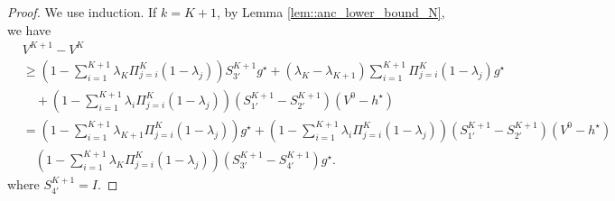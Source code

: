 \documentclass{article} %
\newcommand*{\para}[1]{\left({#1}\right)}
\begin{document}
\begin{proof}

We use induction. If $k=K+1$, by Lemma \ref{lem::anc_lower_bound_N}, we have
\begin{align*}
&V^{K+1}-V^{K} 
\\&\ge \para{1-\sum_{i=1}^{K+1} \lambda_{K} \Pi^{K}_{j=i} (1-\lambda_j)}S_{3'}^{K+1}g^{\star} +(\lambda_{K}-\lambda_{K+1})  \sum_{i=1}^{K+1} \Pi^{K}_{j=i} (1-\lambda_j)g^{\star}
\\& \quad + \para{1-\sum_{i=1}^{K+1} \lambda_i \Pi^{K}_{j=i} (1-\lambda_j)}(S^{K+1}_{1'} -S^{K+1}_{2'})(V^0-h^{\star})
\\& = \para{1-\sum_{i=1}^{K+1} \lambda_{K+1} \Pi^{K}_{j=i} (1-\lambda_j)}g^{\star}+ \para{1-\sum_{i=1}^{K+1} \lambda_i \Pi^{K}_{j=i} (1-\lambda_j)}(S^{K+1}_{1'} -S^{K+1}_{2'})(V^0-h^{\star})
\\& \quad \para{1-\sum_{i=1}^{K+1} \lambda_{K} \Pi^{K}_{j=i} (1-\lambda_j)}\para{S_{3'}^{K+1}-S^{K+1}_{4'}}g^{\star}.
\end{align*}
where $S^{K+1}_{4'}= I$.


\end{proof}
\end{document}
